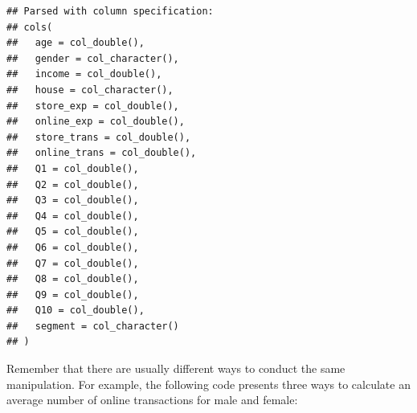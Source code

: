 \documentclass[12pt,]{krantz}
\makeatletter
\newenvironment{Shaded}{\begin{snugshade}}{\end{snugshade}}
\newcommand{\CommentTok}[1]{\textcolor[rgb]{0.37,0.37,0.37}{\textit{#1}}}
\newcommand{\DataTypeTok}[1]{\textcolor[rgb]{0.27,0.27,0.27}{#1}}
\newcommand{\DecValTok}[1]{\textcolor[rgb]{0.06,0.06,0.06}{#1}}
\newcommand{\KeywordTok}[1]{\textcolor[rgb]{0.27,0.27,0.27}{\textbf{#1}}}
\newcommand{\NormalTok}[1]{#1}
\newcommand{\OperatorTok}[1]{\textcolor[rgb]{0.43,0.43,0.43}{\textbf{#1}}}
\newcommand{\StringTok}[1]{\textcolor[rgb]{0.5,0.5,0.5}{#1}}
\newenvironment{kframe}{%
\medskip{}
\setlength{\fboxsep}{.8em}
 \def\at@end@of@kframe{}%
 \ifinner\ifhmode%
  \def\at@end@of@kframe{\end{minipage}}%
  \begin{minipage}{\columnwidth}%
 \fi\fi%
 \def\FrameCommand##1{\hskip\@totalleftmargin \hskip-\fboxsep
 \colorbox{shadecolor}{##1}\hskip-\fboxsep
     \hskip-\linewidth \hskip-\@totalleftmargin \hskip\columnwidth}%
 \MakeFramed {\advance\hsize-\width
   \@totalleftmargin\z@ \linewidth\hsize
   \@setminipage}}%
 {\par\unskip\endMakeFramed%
 \at@end@of@kframe}
\renewenvironment{Shaded}{\begin{kframe}}{\end{kframe}}
\makeatother
\begin{document}
\begin{verbatim}
## Parsed with column specification:
## cols(
##   age = col_double(),
##   gender = col_character(),
##   income = col_double(),
##   house = col_character(),
##   store_exp = col_double(),
##   online_exp = col_double(),
##   store_trans = col_double(),
##   online_trans = col_double(),
##   Q1 = col_double(),
##   Q2 = col_double(),
##   Q3 = col_double(),
##   Q4 = col_double(),
##   Q5 = col_double(),
##   Q6 = col_double(),
##   Q7 = col_double(),
##   Q8 = col_double(),
##   Q9 = col_double(),
##   Q10 = col_double(),
##   segment = col_character()
## )
\end{verbatim}

\begin{Shaded}
\end{Shaded}

Remember that there are usually different ways to conduct the same manipulation. For example, the following code presents three ways to calculate an average number of online transactions for male and female:

\begin{Shaded}
\end{Shaded}
\end{document}

